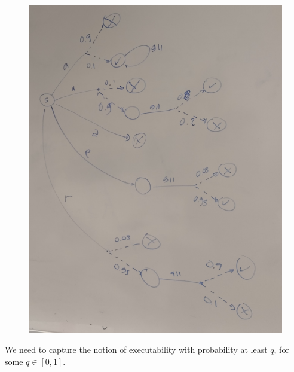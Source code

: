     \begin{figure}[t]
        \begin{center}
            \includegraphics[scale=0.1]{PLTS.jpg}
        \end{center}
    \end{figure}

We need to capture the notion of executability with probability at least $q$, for some $q\in[0,1]$. 

